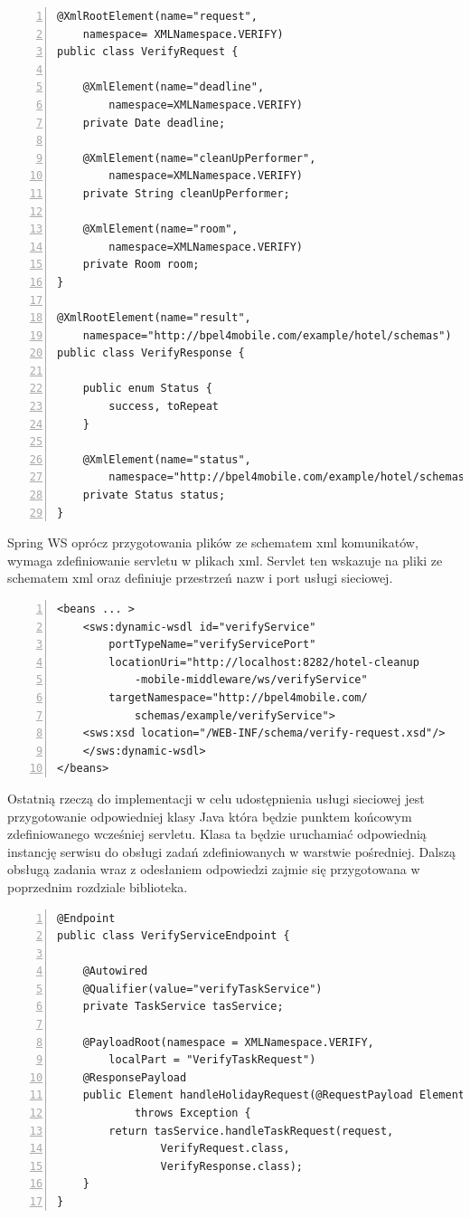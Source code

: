 \begin{lstlisting}[caption=Klasy zawierające komunikaty wejściowe i wyjściowe usługi weryfikacji sprzątania.,numbers=left]
@XmlRootElement(name="request", 
	namespace= XMLNamespace.VERIFY)
public class VerifyRequest {

	@XmlElement(name="deadline",
		namespace=XMLNamespace.VERIFY)
	private Date deadline;

	@XmlElement(name="cleanUpPerformer", 
		namespace=XMLNamespace.VERIFY)
	private String cleanUpPerformer;

	@XmlElement(name="room", 
		namespace=XMLNamespace.VERIFY)
	private Room room;
}

@XmlRootElement(name="result", 
	namespace="http://bpel4mobile.com/example/hotel/schemas")
public class VerifyResponse {

	public enum Status {
		success, toRepeat
	}

	@XmlElement(name="status", 
		namespace="http://bpel4mobile.com/example/hotel/schemas")
	private Status status;
}
\end{lstlisting}

Spring WS oprócz przygotowania plików ze schematem xml komunikatów, wymaga zdefiniowanie servletu w plikach xml. Servlet ten wskazuje na pliki ze schematem xml oraz definiuje przestrzeń nazw i port usługi sieciowej. 

\begin{lstlisting}[caption=Servlet usługi weryfikacji sprzątania.,numbers=left]
<beans ... >
	<sws:dynamic-wsdl id="verifyService" 
		portTypeName="verifyServicePort" 
		locationUri="http://localhost:8282/hotel-cleanup
			-mobile-middleware/ws/verifyService" 
		targetNamespace="http://bpel4mobile.com/
			schemas/example/verifyService"> 
	<sws:xsd location="/WEB-INF/schema/verify-request.xsd"/> 
	</sws:dynamic-wsdl>
</beans>
\end{lstlisting}

Ostatnią rzeczą do implementacji w celu udostępnienia usługi sieciowej jest przygotowanie odpowiedniej klasy Java która będzie punktem końcowym zdefiniowanego wcześniej servletu. Klasa ta będzie uruchamiać odpowiednią instancję serwisu do obsługi zadań zdefiniowanych w warstwie pośredniej. Dalszą obsługą zadania wraz z odesłaniem odpowiedzi zajmie się przygotowana w poprzednim rozdziale biblioteka. 

\begin{lstlisting}[caption=Punkt końcowy usługi weryfikacji sprzątania.,numbers=left]
@Endpoint
public class VerifyServiceEndpoint {

	@Autowired
	@Qualifier(value="verifyTaskService")
	private TaskService tasService;

	@PayloadRoot(namespace = XMLNamespace.VERIFY, 
		localPart = "VerifyTaskRequest") 
	@ResponsePayload
	public Element handleHolidayRequest(@RequestPayload Element request)
			throws Exception {
		return tasService.handleTaskRequest(request, 
				VerifyRequest.class, 
				VerifyResponse.class);
	}
}
\end{lstlisting}

